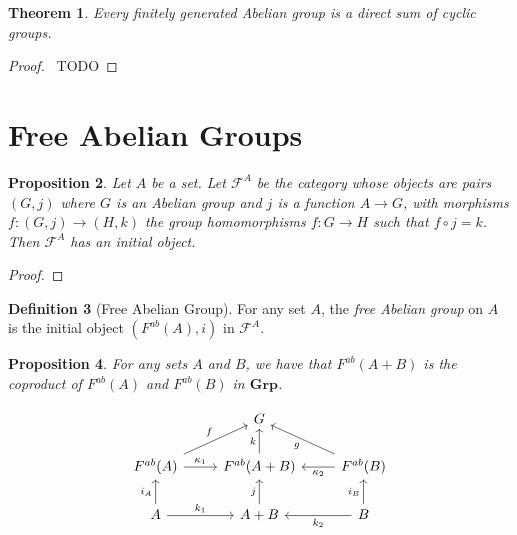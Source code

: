 \documentclass{book}
\let\qed\relax
\newtheorem{prop}{Proposition}[chapter]
\newtheorem{thm}[prop]{Theorem}
\theoremstyle{definition}
\newtheorem{df}[prop]{Definition}
\newcommand{\Grp}{\ensuremath{\mathbf{Grp}}}
\begin{document}
\begin{thm}
Every finitely generated Abelian group is a direct sum of cyclic groups.
\end{thm}

\begin{proof}
\pf\ TODO \qed
\end{proof}

\section{Free Abelian Groups}

\begin{prop}
    Let $A$ be a set. Let $\mathcal{F}^A$ be the category whose objects are pairs $(G,j)$ where $G$ is an Abelian group and $j$ is a function $A \rightarrow G$, with morphisms $f : (G,j) \rightarrow (H,k)$ the group homomorphisms $f : G \rightarrow H$ such that $f \circ j = k$. Then $\mathcal{F}^A$ has an initial object.
\end{prop}

\begin{proof}
    \pf
    \qed
\end{proof}

\begin{df}[Free Abelian Group]
    For any set $A$, the \emph{free Abelian group} on $A$ is the initial object $(F^{ab}(A),i)$ in $\mathcal{F}^A$.
\end{df}

\begin{prop}
    For any sets $A$ and $B$, we have that $F^{ab}(A+B)$ is the coproduct of $F^{ab}(A)$ and $F^{ab}(B)$ in $\Grp$.
\end{prop}

\[ \begin{tikzcd}
        & G & \\
        F^{ab}(A) \arrow[r,"\kappa_1"] \arrow[ur,"f"] & F^{ab}(A+B) \arrow[u,"k"] & \arrow[l,"\kappa_2"] F^{ab}(B) \arrow[ul,"g"] \\
        A \arrow[r,"k_1"] \arrow[u,"i_A"] & A+B \arrow[u,"j"] & \arrow[l,"k_2"] \arrow[u,"i_B"] B
    \end{tikzcd} \]
\end{document}
